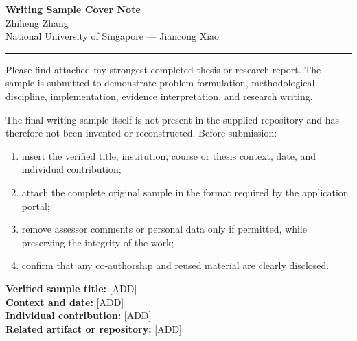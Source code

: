 \documentclass[11pt]{article}
\newcommand{\ApplicantName}{Zhiheng Zhang}
\begin{document}
\begin{center}
{\LARGE\bfseries Writing Sample Cover Note}\\[0.25em]
{\large \ApplicantName}\\
National University of Singapore --- Jiancong Xiao
\end{center}
\vspace{0.35em}\hrule\vspace{0.65em}

Please find attached my strongest completed thesis or research report. The sample is submitted to demonstrate problem formulation, methodological discipline, implementation, evidence interpretation, and research writing.

The final writing sample itself is not present in the supplied repository and has therefore not been invented or reconstructed. Before submission:
\begin{enumerate}
\item insert the verified title, institution, course or thesis context, date, and individual contribution;
\item attach the complete original sample in the format required by the application portal;
\item remove assessor comments or personal data only if permitted, while preserving the integrity of the work;
\item confirm that any co-authorship and reused material are clearly disclosed.
\end{enumerate}

\textbf{Verified sample title:} [ADD]\\
\textbf{Context and date:} [ADD]\\
\textbf{Individual contribution:} [ADD]\\
\textbf{Related artifact or repository:} [ADD]
\end{document}
